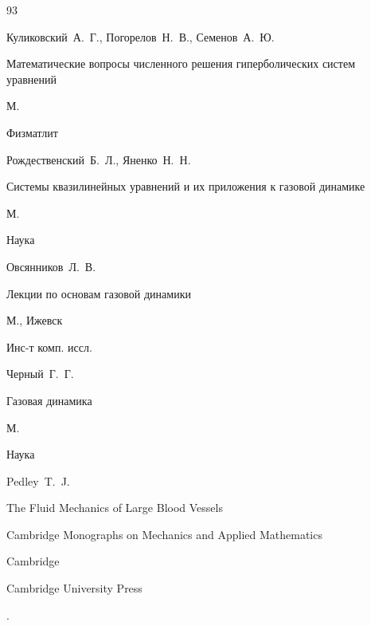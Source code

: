 \begin{thebibliography}{93}

\by Куликовский~А.~Г., Погорелов~Н.~В., Семенов~А.~Ю.

\book Математические вопросы численного решения гиперболических систем уравнений

\publaddr М.

\publ Физматлит







\by Рождественский~Б.~Л., Яненко~Н.~Н.

\book Системы квазилинейных уравнений и их приложения к газовой динамике

\publaddr М.

\publ Наука








\by Овсянников~Л.~В.

\book Лекции по основам газовой динамики

\publaddr М., Ижевск

\publ Инс-т комп. иссл.








\by Черный~Г.~Г.

\book Газовая динамика

\publaddr М.

\publ Наука






\by Pedley~T.~J.

\book The Fluid Mechanics of Large Blood Vessels

\serial Cambridge Monographs on Mechanics and Applied Mathematics

\publaddr Cambridge

\publ Cambridge University Press 

.


\end{thebibliography}
